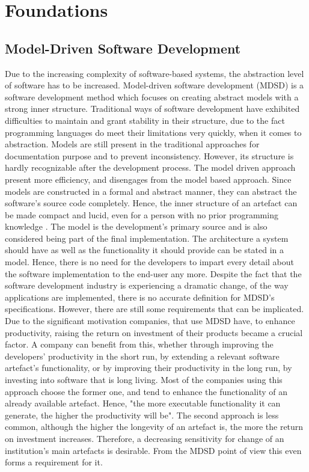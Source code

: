 \chapter{Foundations}
\section{Model-Driven Software Development}
Due to the increasing complexity of software-based systems, the abstraction level of software has to be increased. Model-driven software development (MDSD) is a software development method which focuses on creating abstract models with a strong inner structure. Traditional ways of software development have exhibited difficulties to maintain and grant stability in their structure, due to the fact programming languages do meet their limitations very quickly, when it comes to abstraction. Models are still present in the traditional approaches for documentation purpose and to prevent inconsistency. However, its structure is hardly recognizable after the development process. The model driven approach present more efficiency, and disengages from the model based approach. Since models are constructed in a formal and abstract manner, they can abstract the software's source code completely. Hence, the inner structure of an artefact can be made compact and lucid, even for a person with no prior programming knowledge \cite{voelter2007product}.
The model is the development's primary source and is also considered being part of the final implementation. The architecture a system should have as well as the functionality it should provide can be stated in a model. Hence, there is no need for the developers to impart every detail about the software implementation to the end-user any more. Despite the fact that the software development industry is experiencing a dramatic change, of the way applications are implemented, there is no accurate definition for MDSD's specifications. However, there are still some requirements that can be implicated\cite{AtkinsonG16}. Due to the significant motivation companies, that use MDSD have, to enhance productivity, raising the return on investment of their products became a crucial factor. A company can benefit from this, whether through improving the developers' productivity in the short run, by extending a relevant software artefact's functionality, or by improving their productivity in the long run, by investing into software that is long living. Most of the companies using this approach choose the former one, and tend to enhance the functionality of an already available artefact. Hence, "the more executable functionality it can generate, the higher the productivity will be"\cite{AtkinsonG16}. The second approach is less common, although the higher the longevity of an artefact is, the more the return on investment increases. Therefore, a decreasing sensitivity for change of an institution's main artefacts is desirable. From the MDSD point of view this even forms a requirement for it.
